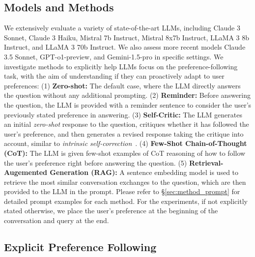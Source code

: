 \subsection{Models and Methods}\label{sec:model_baselines} We extensively evaluate a variety of state-of-the-art LLMs, including Claude 3 Sonnet, Claude 3 Haiku, Mistral 7b Instruct, Mistral 8x7b Instruct, LLaMA 3 8b Instruct, and LLaMA 3 70b Instruct. We also assess more recent models Claude 3.5 Sonnet, GPT-o1-preview, and Gemini-1.5-pro in specific settings. We investigate methods to explicitly help LLMs focus on the preference-following task, with the aim of understanding if they can proactively adapt to user preferences: (1) \textbf{Zero-shot:} The default case, where the LLM directly answers the question without any additional prompting. (2) \textbf{Reminder:} Before answering the question, the LLM is provided with a reminder sentence to consider the user's previously stated preference in answering. (3) \textbf{Self-Critic:} The LLM generates an initial \textit{zero-shot} response to the question, critiques whether it has followed the user's preference, and then generates a revised response taking the critique into account, similar to \textit{intrinsic self-correction}~\citep{huanglarge}. (4) \textbf{Few-Shot Chain-of-Thought (CoT):} The LLM is given few-shot examples of CoT reasoning of how to follow the user's preference right before answering the question. (5) \textbf{Retrieval-Augemented Generation (RAG):} A sentence embedding model is used to retrieve the most similar conversation exchanges to the question, which are then provided to the LLM in the prompt. Please refer to \S\ref{sec:method_prompt} for detailed prompt examples for each method. For the experiments, if not explicitly stated otherwise, we place the user's preference at the beginning of the conversation and query at the end.
\subsection{Explicit Preference Following}



\label{sec: explicit pref}

